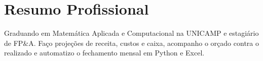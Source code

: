 \renewcommand{\myTitle}{FP\&A \, $|$ \, Planejamento Financeiro \, $|$ \, Forecasting}
\resumeheader

\section{Resumo Profissional}
\resumeSubHeadingListStart
    \item \small{Graduando em Matemática Aplicada e Computacional na UNICAMP e estagiário de FP\&A. Faço projeções de receita, custos e caixa, acompanho o orçado contra o realizado e automatizo o fechamento mensal em Python e Excel.}
\resumeSubHeadingListEnd
